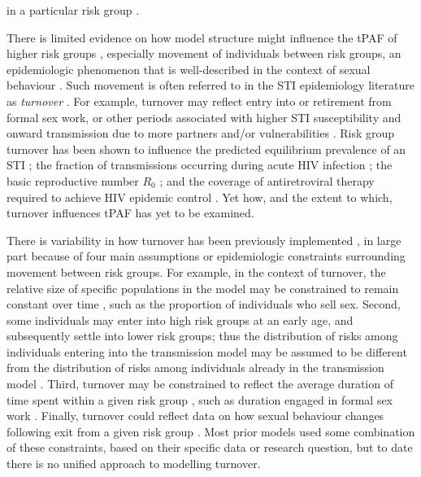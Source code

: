 in a particular risk group \citep{Mishra2016,Mukandavire2018,Maheu-Giroux2017}.
\par
There is limited evidence on how model structure 
might influence the tPAF of higher risk groups
\citep{Mishra2016,Mukandavire2018,Maheu-Giroux2017},
especially movement of individuals between risk groups,
an epidemiologic phenomenon  that is well-described
in the context of sexual behaviour \citep{Watts2010}.
Such movement is often referred to in the STI epidemiology literature as
\textit{turnover} \citep{Watts2010}.
For example, turnover may reflect entry into or retirement from formal sex work,
or other periods associated with higher STI susceptibility and onward transmission
due to more partners and/or vulnerabilities
\citep{Marston2006,Watts2010}.
Risk group turnover has been shown to
influence the predicted equilibrium prevalence of an STI \citep{Stigum1994,Zhang2012};
the fraction of transmissions occurring during acute HIV infection \citep{Zhang2012};
the basic reproductive number $R_0$ \citep{Henry2015}; and
the coverage of antiretroviral therapy required to achieve HIV epidemic control \citep{Henry2015}.
Yet how, and the extent to which, turnover influences tPAF has yet to be examined.
\par
There is variability in how turnover has been previously implemented
\citep{Stigum1994,Koopman1997,Eaton2014,Boily2015},
in large part because of four main assumptions or epidemiologic
constraints surrounding movement between risk groups.
For example, in the context of turnover, the relative 
size of specific populations in the model 
may be constrained to remain constant over time
\citep{Stigum1994,Koopman1997,Eaton2014},
such as the proportion of individuals who sell sex.
Second, some individuals may enter into high risk groups at an early age,
and subsequently settle into lower risk groups;
thus the distribution of risks among individuals entering into the transmission model
may be assumed to be different from
the distribution of risks among individuals already in the transmission model
\citep{Eaton2014}.
Third, turnover may be constrained to reflect the average duration of time spent 
within a given risk group \citep{Boily2015},
such as duration engaged in formal sex work \citep{Watts2010}.
Finally, turnover could reflect data on how sexual behaviour changes
following exit from a given risk group \citep{Boily2015}.
Most prior models used some combination of these constraints,
based on their specific data or research question,
but to date there is no unified approach to modelling turnover.
\par
